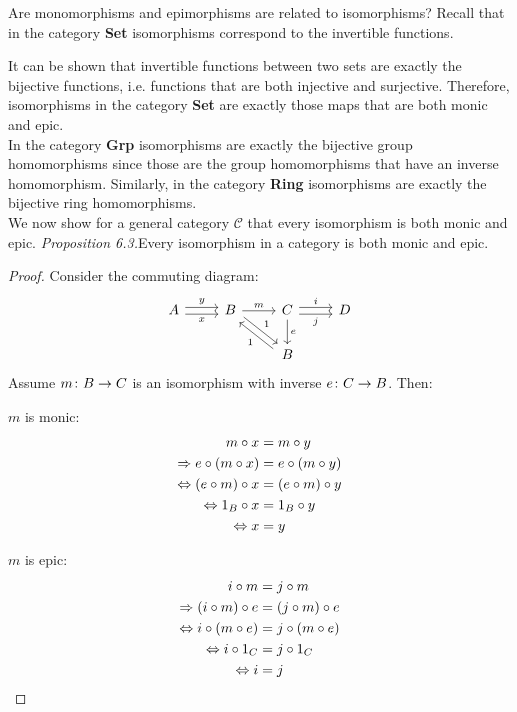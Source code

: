 Are monomorphisms and epimorphisms are related to isomorphisms?
Recall that in the category \textbf{Set} isomorphisms correspond to the invertible functions.

It can be shown that invertible functions between two sets are
exactly the bijective functions, i.e. functions that are both injective and surjective.
Therefore, isomorphisms in the category \textbf{Set} are exactly those maps that are both monic and epic.\\
In the category \textbf{Grp} isomorphisms are exactly the bijective group homomorphisms
since those are the group homomorphisms that have an inverse homomorphism.
Similarly, in the category \textbf{Ring} isomorphisms are exactly the bijective ring homomorphisms.\\
We now show for a general category $\mathscr{C}$ that every isomorphism is both monic and epic.
\textit{Proposition 6.3.}Every isomorphism in a category is both monic and epic.
\begin{proof}
  Consider the commuting diagram:
  \[
    \begin{tikzcd}
      A \arrow[r,shift left, "y"] \arrow[r,shift right,swap,"x"] &
      B \arrow[dr, shift left, "1"]  \arrow{r}{m}  &
      C \arrow{d}{e} \arrow[r,shift left, "i"] \arrow[r,shift right,swap,"j"] & D\\
      &  & B \arrow[ul, shift left, "1"]&
    \end{tikzcd}
  \]
  Assume $m \from B \to C$ is an isomorphism with inverse $e \from C \to B$.
  Then:\\
  \begin{minipage}{.5\linewidth}
    \vspace{4mm}
    \centering $m$ is monic:
    \[
      \begin{aligned}
        m \mathbin{\circ} x &= m \mathbin{\circ} y\\
        \Rightarrow e \mathbin{\circ} (m \mathbin{\circ} x) &= e \mathbin{\circ} (m \mathbin{\circ} y)\\
        \Leftrightarrow (e \mathbin{\circ} m) \mathbin{\circ} x &= (e \mathbin{\circ} m) \mathbin{\circ} y\\
        \Leftrightarrow 1_B \mathbin{\circ} x &= 1_B \mathbin{\circ} y\\
        \Leftrightarrow x &= y
      \end{aligned}
    \]
  \end{minipage}%
  \begin{minipage}{.5\linewidth}
    \vspace{4mm}
    \centering $m$ is epic:
    \[
      \begin{aligned}
        i \mathbin{\circ} m &= j \mathbin{\circ} m \\
        \Rightarrow (i \mathbin{\circ} m) \mathbin{\circ} e &= (j \mathbin{\circ} m) \mathbin{\circ} e\\
        \Leftrightarrow i \mathbin{\circ} (m \mathbin{\circ} e) &= j \mathbin{\circ} (m \mathbin{\circ} e)\\
        \Leftrightarrow i \mathbin{\circ} 1_C &= j \mathbin{\circ} 1_C\\
        \Leftrightarrow i &= j
      \end{aligned}
    \]
  \end{minipage}%
\end{proof}
